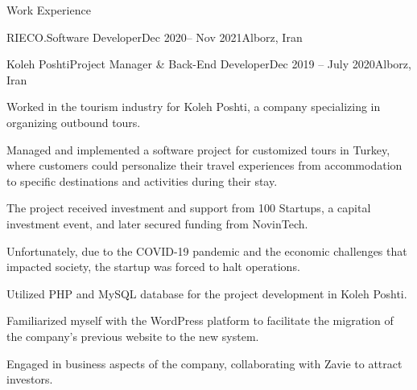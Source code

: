 \documentclass[]{kyvernitis-resume}
\begin{document}
\begin{section}{Work Experience}
\begin{subsection}{RIECO.}{Software Developer}{Dec 2020-- Nov 2021}{Alborz, Iran}
    \end{subsection}
    
    \begin{subsection}{Koleh Poshti}{Project Manager \& Back-End Developer}{Dec 2019 -- July 2020}{Alborz, Iran}
        	\item Worked in the tourism industry for Koleh Poshti, a company specializing in organizing outbound tours.

	\item Managed and implemented a software project for customized tours in Turkey, where customers could personalize their travel experiences from accommodation to specific destinations and activities during their stay.

	\item The project received investment and support from 100 Startups, a capital investment event, and later secured funding from NovinTech.

	\item Unfortunately, due to the COVID-19 pandemic and the economic challenges that impacted society, the startup was forced to halt operations.

	\item Utilized PHP and MySQL database for the project development in Koleh Poshti.

	\item Familiarized myself with the WordPress platform to facilitate the migration of the company's previous website to the new system.

	\item Engaged in business aspects of the company, collaborating with Zavie to attract investors.
    \end{subsection}
    

\end{section}
\end{document}
